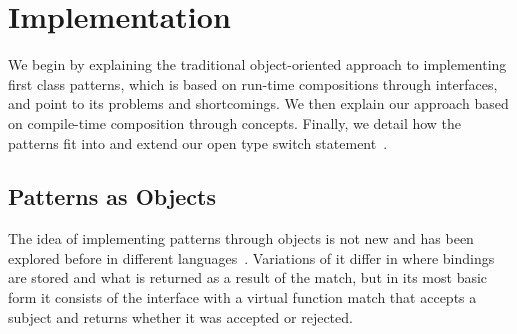 \section{Implementation} %
\label{sec:impl}

We begin by explaining the traditional object-oriented approach to implementing 
first class patterns, which is based on run-time compositions through 
interfaces, and point to its problems and shortcomings. We then explain our 
approach based on compile-time composition through concepts. Finally, we detail 
how the patterns fit into and extend our open type switch statement~\cite{TS12}. 

\subsection{Patterns as Objects}
\label{sec:pao}

The idea of implementing patterns through objects is not new and has been 
explored before in different languages~\cite{Visser06matchingobjects,geller2010pattern,FuncCSharp,Grace2012}.
Variations of it differ in where bindings are stored and what is returned as a 
result of the match, but in its most basic form it consists of the 
 interface with a virtual function {match} that accepts a subject 
and returns whether it was accepted or rejected.


